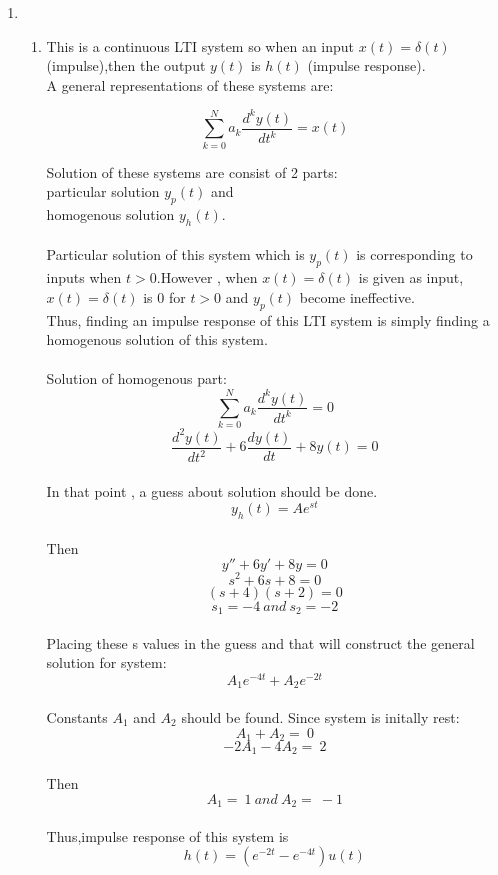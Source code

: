 \documentclass[10pt,a4paper, margin=1in]{article}
\begin{document}
\begin{enumerate}
\item
    \begin{enumerate}
    \item %
    This is a continuous LTI system so when an input $x(t)=\delta(t)$ (impulse),then the output $y(t)$ is $h(t)$ (impulse response).\\
    
    A general representations of these systems are:
    
    $$\sum_{k=0}^{N} a_k\frac{d^ky(t)}{dt^k} = x(t)$$  
    
    Solution of these systems are consist of 2 parts:\\
    particular solution $y_p(t)$ and \\
    homogenous solution $y_h(t)$.\\\\ 
    Particular solution of this system which is $y_p(t)$ is corresponding to inputs when $t>0$.However , when $x(t)=\delta(t)$ is given as input,$x(t)=\delta(t)$ is 0 for $t>0$ and $y_p(t)$ become ineffective.\\
    Thus, finding an impulse response of this LTI system is simply finding a homogenous solution of this system.\\\\
    
    Solution of homogenous part:\\
    $$\sum_{k=0}^{N} a_k\frac{d^ky(t)}{dt^k} = 0$$  
    $$ \frac{d^2y(t)}{dt^2}+6\frac{dy(t)}{dt}+8y(t)=0$$\\
    In that point , a guess about solution should be done.
    $$y_h(t)=Ae^{st}$$\\  
    Then \\
    $$y''+6y'+8y=0$$
    $$s^2+6s+8=0$$
    $$(s+4)(s+2)=0$$
    $$s_1=-4 \ and \ s_2=-2$$\\
    Placing these s values in the guess and that will construct the general solution for system:
    $$A_1e^{-4t}+A_2e^{-2t}$$\\
    Constants $A_1$ and $A_2$ should be found.
    Since system is initally rest:
    $$A_1+A_2 = \ 0$$
    $$-2A_1-4A_2=\ 2$$\\
    Then 
    $$A_1=\ 1 \ and \ A_2=\ -1$$\\
    Thus,impulse response of this system is
    $$h(t) = (e^{-2t}-e^{-4t})u(t)$$
    

\end{enumerate}
\end{enumerate}
\end{document}
